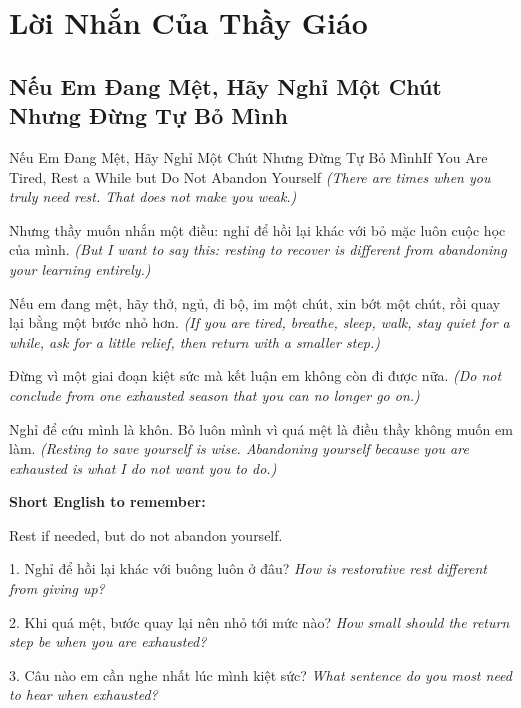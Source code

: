 \chapter{Lời Nhắn Của Thầy Giáo}

\section{Nếu Em Đang Mệt, Hãy Nghỉ Một Chút Nhưng Đừng Tự Bỏ Mình}
\begin{truyen}{Nếu Em Đang Mệt, Hãy Nghỉ Một Chút Nhưng Đừng Tự Bỏ Mình}{If You Are Tired, Rest a While but Do Not Abandon Yourself}
\textit{(There are times when you truly need rest. That does not make you weak.)}

Nhưng thầy muốn nhắn một điều: nghỉ để hồi lại khác với bỏ mặc luôn cuộc học của mình.
\textit{(But I want to say this: resting to recover is different from abandoning your learning entirely.)}

Nếu em đang mệt, hãy thở, ngủ, đi bộ, im một chút, xin bớt một chút, rồi quay lại bằng một bước nhỏ hơn.
\textit{(If you are tired, breathe, sleep, walk, stay quiet for a while, ask for a little relief, then return with a smaller step.)}

Đừng vì một giai đoạn kiệt sức mà kết luận em không còn đi được nữa.
\textit{(Do not conclude from one exhausted season that you can no longer go on.)}
\end{truyen}

\begin{baihoc}
Nghỉ để cứu mình là khôn. Bỏ luôn mình vì quá mệt là điều thầy không muốn em làm.
\textit{(Resting to save yourself is wise. Abandoning yourself because you are exhausted is what I do not want you to do.)}
\end{baihoc}

\begin{ghinhoanh}
\textbf{Short English to remember:}

Rest if needed, but do not abandon yourself.

\end{ghinhoanh}

\begin{tuhocnhanh}
1. Nghỉ để hồi lại khác với buông luôn ở đâu? \textit{How is restorative rest different from giving up?}

2. Khi quá mệt, bước quay lại nên nhỏ tới mức nào? \textit{How small should the return step be when you are exhausted?}

3. Câu nào em cần nghe nhất lúc mình kiệt sức? \textit{What sentence do you most need to hear when exhausted?}
\end{tuhocnhanh}
\ngancach

